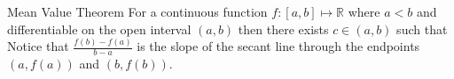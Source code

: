 \begin{theo*}{Mean Value Theorem}
  For a continuous function $f: \left[ a,b \right] \mapsto \mathbb{R} $ where $a < b$ and differentiable on the open interval $ \left( a, b \right)$ then there exists $c \in \left( a, b \right)$ such that 
  Notice that  $ \frac{f\left(b\right)  -  f\left(a\right)}{b  -  a}$ is the slope of the secant line through the endpoints $ \left(  a, f\left(a\right) \right)$ and $ \left( b, f\left(b\right) \right)$.
\end{theo*}
